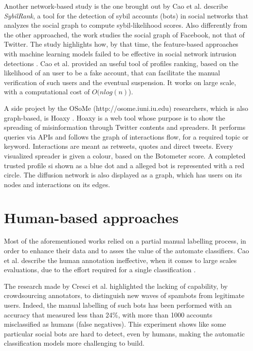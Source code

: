 Another network-based study is the one brought out by Cao et al. \cite{Sybils} describe \textit{SybilRank}, a tool for the detection of sybil accounts (bots) in social networks that analyzes the social graph to compute sybil-likelihood scores. Also differently from the other approached, the work studies the social graph of Facebook, not that of Twitter. The study highlights how, by that time, the feature-based approaches with machine learning models failed to be effective in social network intrusion detections \cite{Intrusion-Detection}. Cao et al. provided an useful tool of profiles ranking, based on the likelihood of an user to be a fake account, that can facilitate the manual verification of such users and the eventual suspension. It works on large scale, with a computational cost of $ O(n log(n) $).

A side project by the OSoMe (http://osome.iuni.iu.edu) researchers, which is also graph-based, is Hoaxy \cite{Misinformation, Hoaxy, Fact-Checking}.
Hoaxy is a web tool whose purpose is to show the spreading of misinformation through Twitter contents and spreaders. It performs queries via APIs and follows the graph of interactions flow, for a required topic or keyword. Interactions are meant as retweets, quotes and direct tweets. Every visualized spreader is given a colour, based on the Botometer score. A completed trusted profile si shown as a blue dot and a alleged bot is represented with a red circle. The diffusion network is also displayed as a graph, which has users on its nodes and interactions on its edges.


\section{Human-based approaches}

Most of the aforementioned works relied on a partial manual labelling process, in order to enhance their data and to asses the value of the automate classifiers. Cao et al. describe the human annotation ineffective, when it comes to large scales evaluations, due to the effort required for a single classification \cite{Sybils}.

The research made by Cresci et al. \cite{Cresci} highlighted the lacking of capability, by crowdsourcing annotators, to distinguish new waves of spambots from legitimate users. Indeed, the manual labelling of such bots has been performed with an accuracy that measured less than 24\%, with more than 1000 accounts misclassified as humans (false negatives). This experiment shows like some particular social bots are hard to detect, even by humans, making the automatic classification models more challenging to build.

